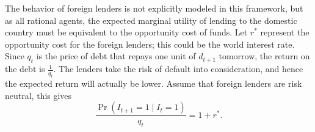 The behavior of foreign lenders is not explicitly modeled in this framework, but as all rational agents, the expected marginal utility of lending to the domestic country must be equivalent to the opportunity cost of funds.
Let $r^*$ represent the opportunity cost for the foreign lenders; this could be the world interest rate. Since $q_t$ is the price of debt that repays one unit of $d_{t+1}$ tomorrow, the return on the debt is $\frac{1}{q_t}$. The lenders take the risk of default into consideration, and hence the expected return will actually be lower. Assume that foreign lenders are risk neutral, this gives
\begin{equation}
    \label{eq:lender}
    \frac{\Pr(I_{t+1}=1 \mid I_{t}=1)}{q_t} = 1 + r^* .
\end{equation}